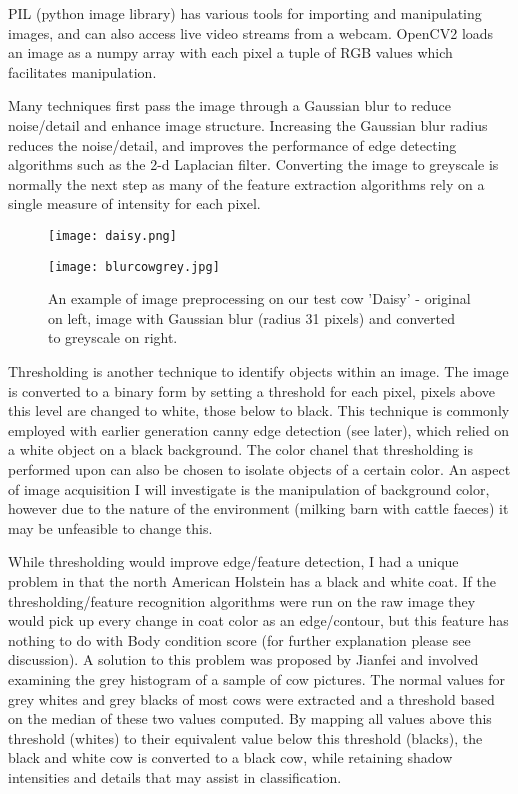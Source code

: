 \documentclass[11pt]{article}
\begin{document}
	PIL (python image library) has various tools for importing and manipulating images, and can also access live video streams from a webcam.
	OpenCV2 loads an image as a numpy array with each pixel a tuple of RGB values which facilitates manipulation.


	Many techniques first pass the image through a Gaussian blur to reduce noise/detail and enhance image structure. 
	Increasing the Gaussian blur radius reduces the noise/detail, and improves the performance of edge detecting algorithms such as the 2-d Laplacian filter.
	Converting the image to greyscale is normally the next step as many of the feature extraction algorithms rely on a single measure of intensity for each pixel.

	\begin{figure}[h]
		\centering
		\parbox{5cm}{\texttt{[image: daisy.png]}}
		\parbox{5cm}{\texttt{[image: blurcowgrey.jpg]}}
		\caption{An example of image preprocessing on our test cow 'Daisy' - original on left, image with Gaussian blur (radius 31 pixels) and converted to greyscale on right.}
	\end{figure}
	\newpage


	Thresholding is another technique to identify objects within an image.
	The image is converted to a binary form by setting a threshold for each pixel, pixels above this level are changed to white, those below to black.
	This technique is commonly employed with earlier generation canny edge detection (see later), which relied on a white object on a black background.
	The color chanel that thresholding is performed upon can also be chosen to isolate objects of a certain color.
	An aspect of image acquisition I will investigate is the manipulation of background color, however due to the nature of the environment (milking barn with cattle faeces) it may be unfeasible to change this.


	While thresholding would improve edge/feature detection, I had a unique problem in that the north American Holstein has a black and white coat.
	If the thresholding/feature recognition algorithms were run on the raw image they would pick up every change in coat color as an edge/contour, but this feature has nothing to do with Body condition score (for further explanation please see discussion).
 	A solution to this problem was proposed by Jianfei \cite{Jianfei2011} and involved examining the grey histogram of a sample of cow pictures.
	The normal values for grey whites and grey blacks of most cows were extracted and a threshold based on the median of these two values computed.
	By mapping all values above this threshold (whites) to their equivalent value below this threshold (blacks), the black and white cow is converted to a black cow, while retaining shadow intensities and details that may assist in classification.
\end{document}
